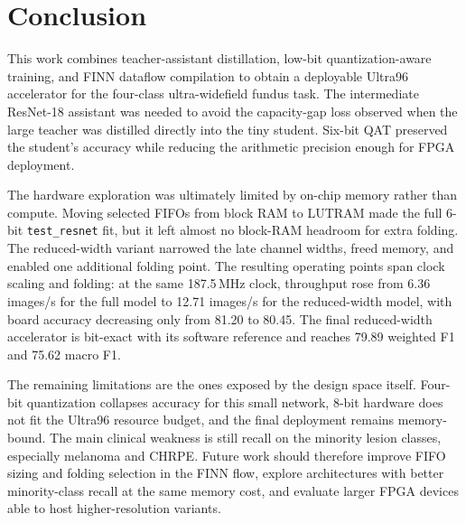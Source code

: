 \section{Conclusion}
\label{sec:conclusion}

This work combines teacher-assistant distillation, low-bit quantization-aware
training, and FINN dataflow compilation to obtain a deployable Ultra96
accelerator for the four-class ultra-widefield fundus task. The intermediate
ResNet-18 assistant was needed to avoid the capacity-gap loss observed when the
large teacher was distilled directly into the tiny student. Six-bit QAT preserved
the student's accuracy while reducing the arithmetic precision enough for FPGA
deployment.

The hardware exploration was ultimately limited by on-chip memory rather than
compute. Moving selected FIFOs from block RAM to LUTRAM made the full 6-bit
\texttt{test\_resnet} fit, but it left almost no block-RAM headroom for extra
folding. The reduced-width variant narrowed the late channel widths, freed memory,
and enabled one additional folding point. The resulting operating points span
clock scaling and folding: at the same 187.5\,MHz clock, throughput rose from
6.36 images/s for the full model to 12.71 images/s for the reduced-width model,
with board accuracy decreasing only from 81.20 to 80.45. The final
reduced-width accelerator is bit-exact with its software reference and reaches
79.89 weighted F1 and 75.62 macro F1.

The remaining limitations are the ones exposed by the design space itself.
Four-bit quantization collapses accuracy for this small network, 8-bit hardware
does not fit the Ultra96 resource budget, and the final deployment remains
memory-bound. The main clinical weakness is still recall on the minority lesion
classes, especially melanoma and CHRPE. Future work should therefore improve
FIFO sizing and folding selection in the FINN flow, explore architectures with
better minority-class recall at the same memory cost, and evaluate larger FPGA
devices able to host higher-resolution variants.
